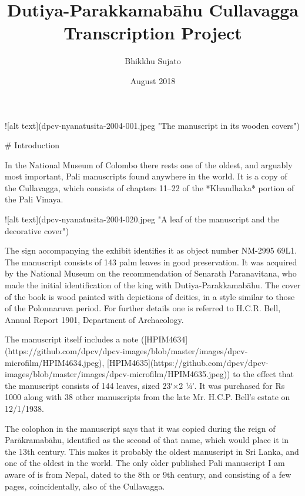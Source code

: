 \documentclass[11pt, openany,a5paper]{article}
\title{Dutiya-Parakkamabāhu Cullavagga Transcription Project}
\author{Bhikkhu Sujato}
\date{August 2018}
\begin{document}
\maketitle

\thispagestyle{empty}

\begin{markdown}

![alt text](dpcv-nyanatusita-2004-001.jpeg "The manuscript in its wooden covers")

\end{markdown}

\newpage

\tableofcontents


\begin{markdown}



# Introduction

In the National Museum of Colombo there rests one of the oldest, and arguably most important, Pali manuscripts found anywhere in the world. It is a copy of the Cullavagga, which consists of chapters 11–22 of the *Khandhaka* portion of the Pali Vinaya.

![alt text](dpcv-nyanatusita-2004-020.jpeg "A leaf of the manuscript and the decorative cover")

The sign accompanying the exhibit identifies it as object number NM-2995 69L1. The manuscript consists of 143 palm leaves in good preservation. It was acquired by the National Museum on the recommendation of Senarath Paranavitana, who made the initial identification of the king with Dutiya-Parakkamabāhu. The cover of the book is wood painted with depictions of deities, in a style similar to those of the Polonnaruva period. For further details one is referred to H.C.R. Bell, Annual Report 1901, Department of Archaeology.

The manuscript itself includes a note ([HPIM4634](https://github.com/dpcv/dpcv-images/blob/master/images/dpcv-microfilm/HPIM4634.jpeg), [HPIM4635](https://github.com/dpcv/dpcv-images/blob/master/images/dpcv-microfilm/HPIM4635.jpeg)) to the effect that the manuscript consists of 144 leaves, sized 23ʹ×2 ¼ʹ. It was purchased for Rs 1000 along with 38 other manuscripts from the late Mr. H.C.P. Bell’s estate on 12/1/1938.

The colophon in the manuscript says that it was copied during the reign of Parākramabāhu, identified as the second of that name, which would place it in the 13th century. This makes it probably the oldest manuscript in Sri Lanka, and one of the oldest in the world. The only older published Pali manuscript I am aware of is from Nepal, dated to the 8th or 9th century, and consisting of a few pages, coincidentally, also of the Cullavagga.


\end{markdown}
\end{document}
